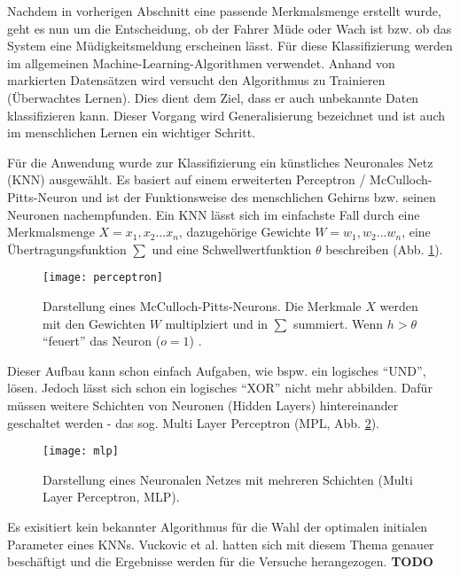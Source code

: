 \label{sec:classification}
Nachdem in vorherigen Abschnitt eine passende Merkmalsmenge erstellt wurde, geht es nun um die Entscheidung, ob der Fahrer Müde oder Wach ist bzw. ob das System eine Müdigkeitsmeldung erscheinen lässt. Für diese Klassifizierung werden im allgemeinen Machine-Learning-Algorithmen verwendet. Anhand von markierten Datensätzen wird versucht den Algorithmus zu Trainieren (Überwachtes Lernen). Dies dient dem Ziel, dass er auch unbekannte Daten klassifizieren kann. Dieser Vorgang wird Generalisierung bezeichnet und ist auch im menschlichen Lernen ein wichtiger Schritt.

Für die Anwendung wurde zur Klassifizierung ein künstliches Neuronales Netz (KNN) ausgewählt. Es basiert auf einem erweiterten Perceptron / McCulloch-Pitts-Neuron \cite{ann} und ist der Funktionsweise des menschlichen Gehirns bzw. seinen Neuronen nachempfunden\cite{marsland_opac-b1129336}. Ein KNN lässt sich im einfachste Fall durch eine Merkmalsmenge $X = x_1, x_2 ... x_n$, dazugehörige Gewichte $W = w_1, w_2 ... w_n$, eine Übertragungsfunktion $\sum$ und eine Schwellwertfunktion $\theta$ beschreiben (Abb. \ref{fig:perceptron}).

\begin{figure}[h] 
  \begin{center}
    \texttt{[image: perceptron]}
    \caption[Schema eines Perceptrons / McCulloch-Pitts-Neurons]{Darstellung eines McCulloch-Pitts-Neurons. Die Merkmale $X$ werden mit den Gewichten $W$ multiplziert und in $\sum$ summiert. Wenn $h > \theta$ "`feuert"' das Neuron ($o = 1$) \cite{marsland_opac-b1129336}. \label{fig:perceptron}}
  \end{center}
\end{figure}

Dieser Aufbau kann schon einfach Aufgaben, wie bspw. ein logisches "`UND"', lösen. Jedoch lässt sich schon ein logisches "`XOR"' nicht mehr abbilden. Dafür müssen weitere Schichten von Neuronen (Hidden Layers) hintereinander geschaltet werden - das sog. Multi Layer Perceptron (MPL, Abb. \ref{fig:mlp}).

\begin{figure}[h] 
  \begin{center}
    \texttt{[image: mlp]}
    \caption[Schema eines Multi-Layer-Perceptrons]{Darstellung eines Neuronalen Netzes mit mehreren Schichten (Multi Layer Perceptron, MLP)\cite{marsland_opac-b1129336}. \label{fig:mlp}}
  \end{center}
\end{figure}

Es exisitiert kein bekannter Algorithmus für die Wahl der optimalen initialen Parameter eines KNNs. Vuckovic et al. \cite{Vuckovic2002349} hatten sich mit diesem Thema genauer beschäftigt und die Ergebnisse werden für die Versuche herangezogen.
\textbf{TODO}